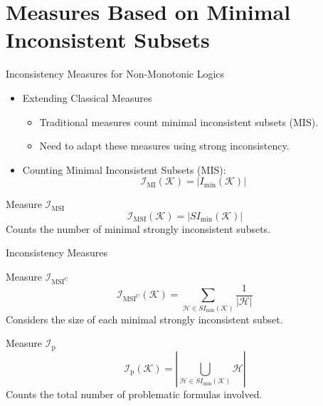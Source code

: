 \section{Measures Based on Minimal Inconsistent Subsets}

\begin{frame}{Inconsistency Measures for Non-Monotonic Logics}
    \begin{itemize}
        \item Extending Classical Measures
              \begin{itemize}
                  \item Traditional measures count minimal inconsistent subsets (MIS).
                  \item Need to adapt these measures using strong inconsistency.
              \end{itemize}
        \item Counting Minimal Inconsistent Subsets (MIS):
              \[
                  \mathcal{I}_{\text{MI}}(\mathcal{K}) = \left| I_{\min}(\mathcal{K}) \right|
              \]
    \end{itemize}
    \begin{block}{Measure \( \mathcal{I}_{\text{MSI}} \)}
        \[
            \mathcal{I}_{\text{MSI}}(\mathcal{K}) = \left| SI_{\min}(\mathcal{K}) \right|
        \]
        Counts the number of minimal strongly inconsistent subsets.
    \end{block}
\end{frame}

\begin{frame}{Inconsistency Measures}
    \begin{block}{Measure \( \mathcal{I}_{\text{MSI}^\text{C}} \)}
        \[
            \mathcal{I}_{\text{MSI}^\text{C}}(\mathcal{K}) = \sum\limits_{\mathcal{H} \in SI_{\min}(\mathcal{K})} \frac{1}{|\mathcal{H}|}
        \]
        Considers the size of each minimal strongly inconsistent subset.
    \end{block}
    \begin{block}{Measure \( \mathcal{I}_{\text{p}} \)}
        \[
            \mathcal{I}_{\text{p}}(\mathcal{K}) = \left| \bigcup\limits_{\mathcal{H} \in SI_{\min}(\mathcal{K})} \mathcal{H} \right|
        \]
        Counts the total number of problematic formulas involved.
    \end{block}
\end{frame}

